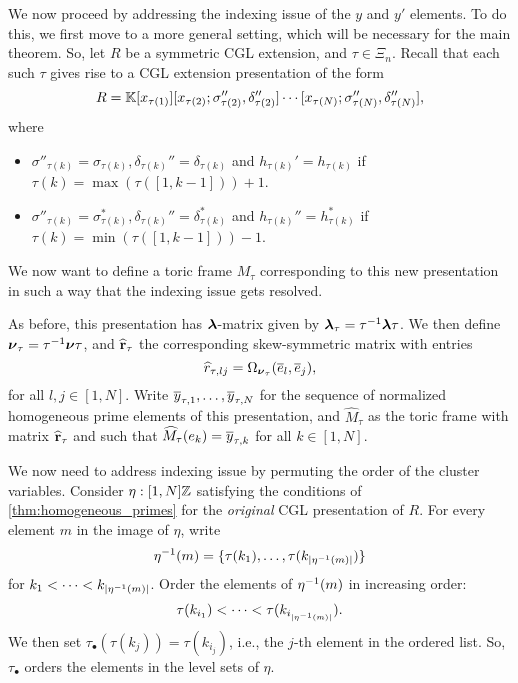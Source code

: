 We now proceed by addressing the indexing issue of the $y$ and $y'$ elements. To do
this, we first move to a more general setting, which will be necessary for the main
theorem. So, let $R$ be a symmetric CGL extension, and $\tau \in \Xi_n$. Recall that
each such $\tau$ gives rise to a CGL extension presentation of the form
\begin{equation*}
	R = \mathbb{K}[x_{\tau(1)}][x_{\tau(2)}; \sigma_{\tau(2)}'', \delta_{\tau(2)}''] \cdots [x_{\tau(N)}; \sigma_{\tau(N)}'', \delta_{\tau(N)}''],
\end{equation*}
%
where
\begin{itemize}
	\item $\sigma''_{\tau(k)} = \sigma_{\tau(k)}, \delta_{\tau(k)}'' = \delta_{\tau(k)}$
	      and $h_{\tau(k)}' = h_{\tau(k)}$ if $\tau(k) = \max(\tau([1,k-1])) + 1$.
	\item $\sigma''_{\tau(k)} = \sigma^*_{\tau(k)}, \delta_{\tau(k)}'' = \delta^*_{\tau(k)}$ and
	      $h_{\tau(k)}'' = h_{\tau(k)}^*$ if $\tau(k) = \min(\tau([1,k-1])) - 1$.
\end{itemize}

We now want to define a toric frame $M_\tau$ corresponding to this new presentation in
such a way that the indexing issue gets resolved.

As before, this presentation has $\boldsymbol{\lambda}$-matrix given by $\boldsymbol{\lambda}_\tau = \tau^{-1} \boldsymbol{\lambda}
	\tau$. We then define $\boldsymbol{\nu}_\tau = \tau^{-1} \boldsymbol{\nu} \tau$, and $\widehat{\mathbf{r}}_\tau$ the
corresponding skew-symmetric matrix with entries
\begin{equation*}
	\widehat{r}_{\tau, lj} = \Omega_{\boldsymbol{\nu}_\tau}(\overline{e}_l, \overline{e}_j),
\end{equation*}
%
for all $l, j \in [1, N]$.	Write $\overline{y}_{\tau, 1}, \dots, \overline{y}_{\tau, N}$ for the
sequence of normalized homogeneous prime elements of this presentation, and
$\widehat{M}_\tau$ as the toric frame with matrix $\widehat{\mathbf{r}}_\tau$ and such that
$\widehat{M}_\tau (e_k) = \overline{y}_{\tau, k}$ for all $k \in [1, N]$.

We now need to address indexing issue by permuting the order of the cluster variables.
Consider $\eta : [1, N] \mathbb{Z}$ satisfying the conditions of
\cref{thm:homogeneous_primes} for the \emph{original} CGL presentation of $R$. For
every element $m$ in the image of $\eta$, write
\begin{equation*}
	\eta^{-1}(m) = \{\tau(k_1), \dots, \tau(k_{|\eta^{-1}(m)|})\}
\end{equation*}
for $k_1 < \cdots < k_{|\eta^{-1}(m)|}$. Order the elements of $\eta^{-1}(m)$ in increasing order:
\begin{equation*}
	\tau(k_{i_1}) < \cdots < \tau(k_{i_{|\eta^{-1}(m)|}}).
\end{equation*}
We then set $\tau_\bullet(\tau(k_j)) = \tau(k_{i_j})$, i.e., the $j$-th element in the ordered list. So, $\tau_\bullet$ orders the elements in the level sets of $\eta$.

